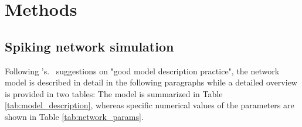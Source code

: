\chapter{Methods}
\label{sec:methods}

\section{Spiking network simulation}
\label{subsec:methods_simulation}
Following \citeauthor{nordlie2009}'s.~\cite{nordlie2009} suggestions on 
"good model description practice",
the network model is described in detail in the following paragraphs while a detailed 
overview is provided in two tables: The model is summarized in Table 
\ref{tab:model_description}, 
whereas specific numerical values of the parameters are shown in Table 
\ref{tab:network_params}. 


